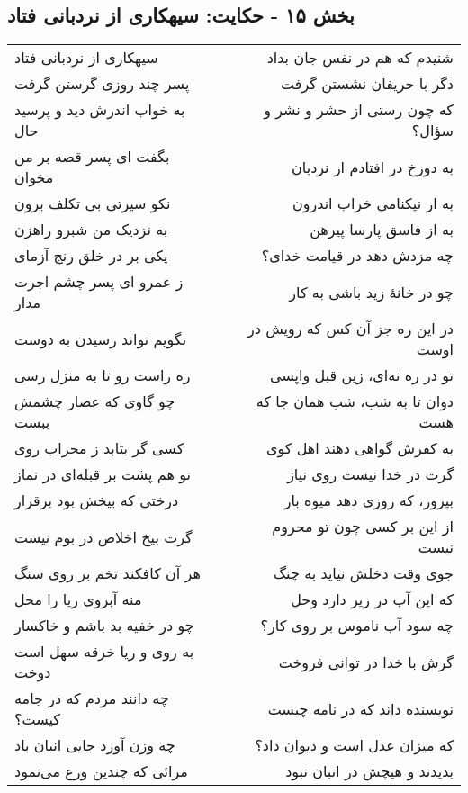 \begin{center}
\section*{بخش ۱۵ - حکایت: سیهکاری از نردبانی فتاد}
\label{sec:015}
\begin{longtable}{l p{0.5cm} r}
سیهکاری از نردبانی فتاد
&&
شنیدم که هم در نفس جان بداد
\\
پسر چند روزی گرستن گرفت
&&
دگر با حریفان نشستن گرفت
\\
به خواب اندرش دید و پرسید حال
&&
که چون رستی از حشر و نشر و سؤال؟
\\
بگفت ای پسر قصه بر من مخوان
&&
به دوزخ در افتادم از نردبان
\\
نکو سیرتی بی تکلف برون
&&
به از نیکنامی خراب اندرون
\\
به نزدیک من شبرو راهزن
&&
به از فاسق پارسا پیرهن
\\
یکی بر در خلق رنج آزمای
&&
چه مزدش دهد در قیامت خدای؟
\\
ز عمرو ای پسر چشم اجرت مدار
&&
چو در خانهٔ زید باشی به کار
\\
نگویم تواند رسیدن به دوست
&&
در این ره جز آن کس که رویش در اوست
\\
ره راست رو تا به منزل رسی
&&
تو در ره نه‌ای، زین قبل واپسی
\\
چو گاوی که عصار چشمش ببست
&&
دوان تا به شب، شب همان جا که هست
\\
کسی گر بتابد ز محراب روی
&&
به کفرش گواهی دهند اهل کوی
\\
تو هم پشت بر قبله‌ای در نماز
&&
گرت در خدا نیست روی نیاز
\\
درختی که بیخش بود برقرار
&&
بپرور، که روزی دهد میوه بار
\\
گرت بیخ اخلاص در بوم نیست
&&
از این بر کسی چون تو محروم نیست
\\
هر آن کافکند تخم بر روی سنگ
&&
جوی وقت دخلش نیاید به چنگ
\\
منه آبروی ریا را محل
&&
که این آب در زیر دارد وحل
\\
چو در خفیه بد باشم و خاکسار
&&
چه سود آب ناموس بر روی کار؟
\\
به روی و ریا خرقه سهل است دوخت
&&
گرش با خدا در توانی فروخت
\\
چه دانند مردم که در جامه کیست؟
&&
نویسنده داند که در نامه چیست
\\
چه وزن آورد جایی انبان باد
&&
که میزان عدل است و دیوان داد؟
\\
مرائی که چندین ورع می‌نمود
&&
بدیدند و هیچش در انبان نبود
\\

\end{longtable}
\end{center}
